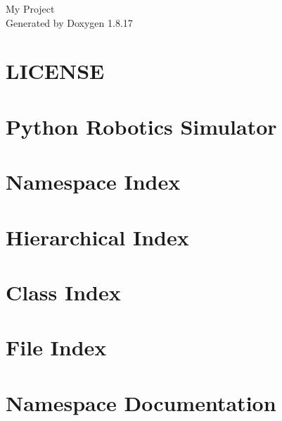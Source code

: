 \let\mypdfximage\pdfximage\def\pdfximage{\immediate\mypdfximage}\documentclass[twoside]{book}
\newcommand{\+}{\discretionary{\mbox{\scriptsize$\hookleftarrow$}}{}{}}
\newcommand{\clearemptydoublepage}{%
  \newpage{\pagestyle{empty}\cleardoublepage}%
}
\begin{document}
\hypersetup{pageanchor=false,
             bookmarksnumbered=true,
             pdfencoding=unicode
            }
\begin{titlepage}
\vspace*{7cm}
\begin{center}%
{\Large My Project }\\
\vspace*{1cm}
{\large Generated by Doxygen 1.8.17}\\
\end{center}
\end{titlepage}
\clearemptydoublepage
{}
\tableofcontents
\clearemptydoublepage
{}
\hypersetup{pageanchor=true}

\chapter{L\+I\+C\+E\+N\+SE}
\label{md__l_i_c_e_n_s_e}

\chapter{Python Robotics Simulator}
\label{md__r_e_a_d_m_e}

\chapter{Namespace Index}

\chapter{Hierarchical Index}

\chapter{Class Index}

\chapter{File Index}

\chapter{Namespace Documentation}




















\end{document}

